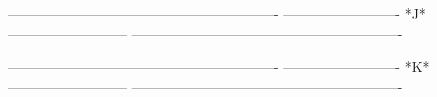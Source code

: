 ----------------------------------------------------------
-------------------------  *J*  --------------------------
----------------------------------------------------------
 
 
 
 
 
 
 
 
 
 
 
 
 
 
 
 
 
 
 
 
 
 
 
 
 
 
 
 
 
 
 
 
 
 
 
 
 
 
 
 
 
 
 
 
 
 
 
 
 
 
 
 
 
 
 
 
 
 
 
 
 
 
 
 
 
 
 
 
 
 
 
 
 
 
 
 
 
 
 
 
 
 
 
 
 
 
 
 
 
 
 
 
 
 
 
 
 
----------------------------------------------------------
-------------------------  *K*  --------------------------
----------------------------------------------------------
 
 
 
 
 
